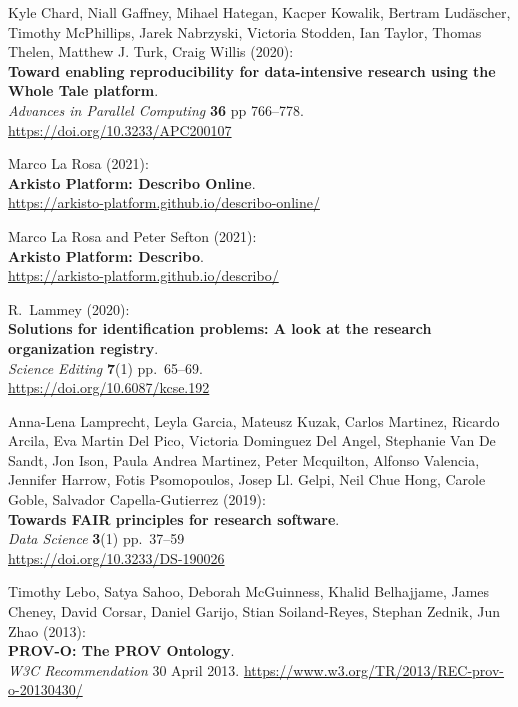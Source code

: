 \begin{thebibliography}{9}
Kyle Chard, Niall Gaffney, Mihael Hategan, Kacper Kowalik,
Bertram Ludäscher, Timothy McPhillips, Jarek Nabrzyski, Victoria
Stodden, Ian Taylor, Thomas Thelen, Matthew J. Turk, Craig Willis
(2020):\\
\textbf{Toward enabling reproducibility for data-intensive research
using the Whole Tale platform}.\\
\emph{Advances in Parallel Computing} \textbf{36} pp 766--778.\\
\url{https://doi.org/10.3233/APC200107}

Marco La Rosa (2021):\\
\textbf{Arkisto Platform: Describo Online}.\\
\url{https://arkisto-platform.github.io/describo-online/}

Marco La Rosa and Peter Sefton (2021):\\
\textbf{Arkisto Platform: Describo}.\\
\url{https://arkisto-platform.github.io/describo/}

R.~Lammey (2020):\\
\textbf{Solutions for identification problems: A look at the research
organization registry}.\\
\emph{Science Editing} \textbf{7}(1) pp.~65--69.\\
\url{https://doi.org/10.6087/kcse.192}

Anna-Lena Lamprecht, Leyla Garcia, Mateusz Kuzak, Carlos
Martinez, Ricardo Arcila, Eva Martin Del Pico, Victoria Dominguez Del
Angel, Stephanie Van De Sandt, Jon Ison, Paula Andrea Martinez, Peter
Mcquilton, Alfonso Valencia, Jennifer Harrow, Fotis Psomopoulos, Josep
Ll. Gelpi, Neil Chue Hong, Carole Goble, Salvador Capella-Gutierrez
(2019):\\
\textbf{Towards FAIR principles for research software}.\\
\emph{Data Science} \textbf{3}(1) pp.~37--59\\
\url{https://doi.org/10.3233/DS-190026}

Timothy Lebo, Satya Sahoo, Deborah McGuinness, Khalid Belhajjame, 
James Cheney, David Corsar, Daniel Garijo, Stian Soiland-Reyes, 
Stephan Zednik, Jun Zhao (2013):\\
\textbf{PROV-O: The PROV Ontology}.\\
\emph{W3C Recommendation} 30 April 2013.
\url{https://www.w3.org/TR/2013/REC-prov-o-20130430/}


\end{thebibliography}

